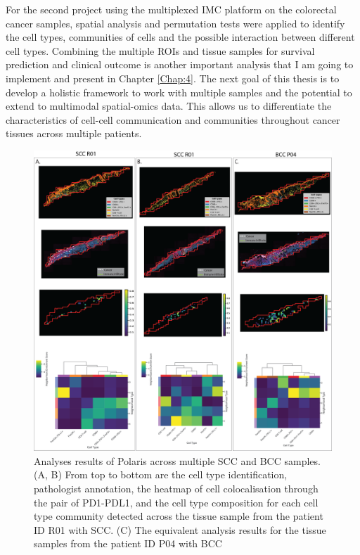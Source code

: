 For the second project using the multiplexed IMC platform on the colorectal cancer samples, spatial analysis and permutation tests were applied to identify the cell types, communities of cells and the possible interaction between different cell types. Combining the multiple ROIs and tissue samples for survival prediction and clinical outcome is another important analysis that I am going to implement and present in Chapter \ref{Chap:4}. The next goal of this thesis is to develop a holistic framework to work with multiple samples and the potential to extend to multimodal spatial-omics data. This allows us to differentiate the characteristics of cell-cell communication and communities throughout cancer tissues across multiple patients. 

\begin{figure}[htp]
\renewcommand{\figurename}{Figure}
    \centering
    \includegraphics[width=1.0\columnwidth]{Chapter3/Figures/Chap3_supple_figure_1.png}
     \caption[Analyses results of Polaris across multiple SCC and BCC samples]{Analyses results of Polaris across multiple SCC and BCC samples. (A, B) From top to bottom are the cell type identification, pathologist annotation, the heatmap of cell colocalisation through the pair of PD1-PDL1, and the cell type composition for each cell type community detected across the tissue sample from the patient ID R01 with SCC. (C) The equivalent analysis results for the tissue samples from the patient ID P04 with BCC}
    \label{fig:Chap3_figure6}
\end{figure}


